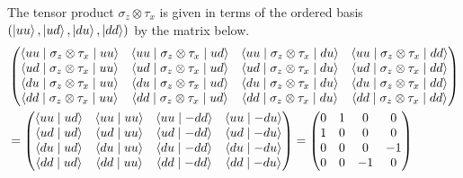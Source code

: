 \begin{answer}
	The tensor product $\sigma_z \otimes \tau_x$ is given in terms of the ordered basis $\left(\ket{u u}, \ket{u d}, \ket{d u}, \ket{d d}\right)$ by the matrix below.
	\begin{align*}
		 &
		\begin{pmatrix}
			\braket{u u \mid \sigma_z \otimes \tau_x \mid u u } &
			\braket{u u \mid \sigma_z \otimes \tau_x \mid u d } &
			\braket{u u \mid \sigma_z \otimes \tau_x \mid d u } &
			\braket{u u \mid \sigma_z \otimes \tau_x \mid d d }   \\
			\braket{u d \mid \sigma_z \otimes \tau_x \mid u u } &
			\braket{u d \mid \sigma_z \otimes \tau_x \mid u d } &
			\braket{u d \mid \sigma_z \otimes \tau_x \mid d u } &
			\braket{u d \mid \sigma_z \otimes \tau_x \mid d d }   \\
			\braket{d u \mid \sigma_z \otimes \tau_x \mid u u } &
			\braket{d u \mid \sigma_z \otimes \tau_x \mid u d } &
			\braket{d u \mid \sigma_z \otimes \tau_x \mid d u } &
			\braket{d u \mid \sigma_z \otimes \tau_x \mid d d }   \\
			\braket{d d \mid \sigma_z \otimes \tau_x \mid u u } &
			\braket{d d \mid \sigma_z \otimes \tau_x \mid u d } &
			\braket{d d \mid \sigma_z \otimes \tau_x \mid d u } &
			\braket{d d \mid \sigma_z \otimes \tau_x \mid d d }   \\
		\end{pmatrix}
		\\ & =
		\begin{pmatrix}
			\braket{u u \mid   u d } &
			\braket{u u \mid   u u } &
			\braket{u u \mid - d d } &
			\braket{u u \mid - d u }   \\
			\braket{u d \mid   u d } &
			\braket{u d \mid   u u } &
			\braket{u d \mid - d d } &
			\braket{u d \mid - d u }   \\
			\braket{d u \mid   u d } &
			\braket{d u \mid   u u } &
			\braket{d u \mid - d d } &
			\braket{d u \mid - d u }   \\
			\braket{d d \mid   u d } &
			\braket{d d \mid   u u } &
			\braket{d d \mid - d d } &
			\braket{d d \mid - d u }   \\
		\end{pmatrix}
		=
		\begin{pmatrix}
			0  &
			1  &
			0  &
			0    \\
			1  &
			0  &
			0  &
			0    \\
			0  &
			0  &
			0  &
			-1   \\
			0  &
			0  &
			-1 &
			0    \\
		\end{pmatrix}
	\end{align*}
\end{answer}


